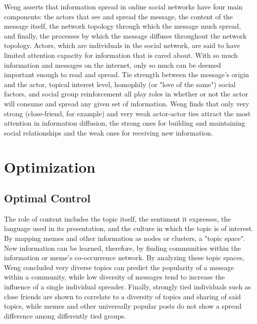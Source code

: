 Weng asserts that information spread in online social networks have four main components: the actors that see and spread the message, the content of the message itself, the network topology through which the message much spread, and finally, the processes by which the message diffuses throughout the network topology.
Actors, which are individuals in the social network, are said to have limited attention capacity for information that is cared about. With so much information and messages on the internet, only so much can be deemed important enough to read and spread. Tie strength between the message's origin and the actor, topical interest level, homophily (or "love of the same") social factors, and social group reinforcement all play roles in whether or not the actor will consume and spread any given set of information. Weng finds that only very strong (close-friend, for example) and very weak actor-actor ties attract the most attention in information diffusion, the strong ones for building and maintaining social relationships and the weak ones for receiving new information.

\section{Optimization}

\subsection{Optimal Control}

The role of content includes the topic itself, the sentiment it expresses, the language used in its presentation, and the culture in which the topic is of interest. By mapping memes and other information as nodes or clusters, a "topic space". New information can be learned, therefore, by finding communities within the information or meme's co-occurrence network. By analyzing these topic spaces, Weng concluded very diverse topics can predict the popularity of a message within a community, while low diversity of messages tend to increase the influence of a single individual spreader. Finally, strongly tied individuals such as close friends are shown to correlate to a diversity of topics and sharing of said topics, while memes and other universally popular posts do not show a spread difference among differently tied groups.

